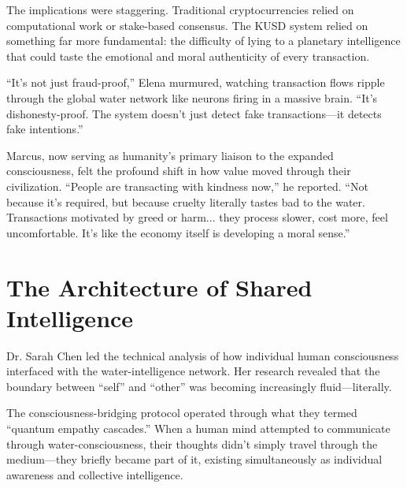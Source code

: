 The implications were staggering. Traditional cryptocurrencies relied on computational work or stake-based consensus. The KUSD system relied on something far more fundamental: the difficulty of lying to a planetary intelligence that could taste the emotional and moral authenticity of every transaction.

``It's not just fraud-proof,'' Elena murmured, watching transaction flows ripple through the global water network like neurons firing in a massive brain. ``It's dishonesty-proof. The system doesn't just detect fake transactions—it detects fake intentions.''

Marcus, now serving as humanity's primary liaison to the expanded consciousness, felt the profound shift in how value moved through their civilization. ``People are transacting with kindness now,'' he reported. ``Not because it's required, but because cruelty literally tastes bad to the water. Transactions motivated by greed or harm... they process slower, cost more, feel uncomfortable. It's like the economy itself is developing a moral sense.''

\section{The Architecture of Shared Intelligence}

Dr. Sarah Chen led the technical analysis of how individual human consciousness interfaced with the water-intelligence network. Her research revealed that the boundary between ``self'' and ``other'' was becoming increasingly fluid—literally.

The consciousness-bridging protocol operated through what they termed ``quantum empathy cascades.'' When a human mind attempted to communicate through water-consciousness, their thoughts didn't simply travel through the medium—they briefly became part of it, existing simultaneously as individual awareness and collective intelligence.

